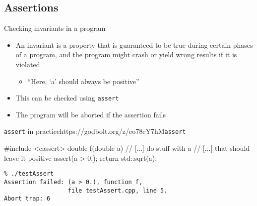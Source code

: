 \subsection[assert]{Assertions}

\begin{frame}[fragile]
  \begin{block}{Checking invariants in a program}
    \begin{itemize}
      \item An invariant is a property that is guaranteed to be true during certain phases of a program, and the program might crash or yield wrong results if it is violated
      \begin{itemize}
        \item ``Here, `a' should always be positive''
      \end{itemize}
      \item This can be checked using \texttt{assert}
      \item The program will be aborted if the assertion fails
    \end{itemize}
  \end{block}
  \begin{exampleblockGB}{\texttt{assert} in practice}{https://godbolt.org/z/eo78cY7hM}{\texttt{assert}}
    \begin{overprint}
    \begin{cppcode*}{}
      #include <cassert>
      double f(double a) {
        // [...] do stuff with a
        // [...] that should leave it positive
        assert(a > 0.);
        return std::sqrt(a);
      }
    \end{cppcode*}
    \begin{Verbatim}
% ./testAssert
Assertion failed: (a > 0.), function f,
                  file testAssert.cpp, line 5.
Abort trap: 6
    \end{Verbatim}
    \end{overprint}
  \end{exampleblockGB}
\end{frame}

